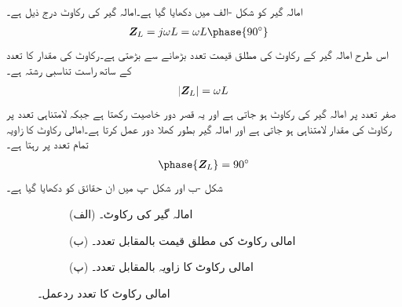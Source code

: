 امالہ گیر کو شکل -الف میں دکھایا گیا ہے۔امالہ گیر کی رکاوٹ درج ذیل ہے۔
\begin{align}
\bZ_L&=j\omega L=\omega L\phase{90^{\circ}}
\end{align}
اس طرح امالہ گیر کے رکاوٹ کی مطلق قیمت تعدد بڑھانے سے بڑھتی ہے۔رکاوٹ کی مقدار کا تعدد کے ساتھ راست تناسبی رشتہ ہے۔
\begin{align}
\abs{{{\boldsymbol{Z}}}_L}=\omega L
\end{align}
صفر تعدد پر امالہ گیر کی رکاوٹ  ہو جاتی ہے اور یہ قصر دور خاصیت رکھتا ہے جبکہ لامتناہی تعدد پر رکاوٹ کی مقدار لامتناہی ہو جاتی ہے اور امالہ گیر بطور کھلا دور عمل کرتا ہے۔امالی رکاوٹ کا زاویہ تمام تعدد پر  رہتا ہے۔
\begin{align}
\phase{\bZ_L}=90^{\circ}
\end{align}
شکل -ب اور شکل -پ میں ان حقائق کو دکھایا گیا ہے۔
\begin{figure}
\centering
\begin{subfigure}{1\textwidth}
\centering
{}
\caption*{(الف) امالہ گیر کی رکاوٹ۔}
\end{subfigure}
\begin{subfigure}{0.5\textwidth}
\centering
{}%
\caption*{(ب) امالی رکاوٹ کی مطلق قیمت بالمقابل تعدد۔}
\end{subfigure}%
\begin{subfigure}{0.5\textwidth}
\centering
{}%
\caption*{(پ) امالی رکاوٹ کا زاویہ بالمقابل تعدد۔}
\end{subfigure}%
\caption{امالی رکاوٹ کا تعدد ردعمل۔}
\label{شکل_تعددی_امالی_ردعمل}
\end{figure}

